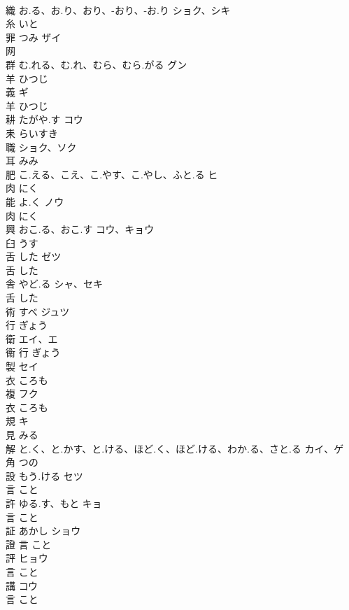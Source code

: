 \documentclass[8pt]{extreport}
\begin{document}
\begin{CJK}{UTF8}{min}
\\	織	お.る、お.り、おり、-おり、-お.り	ショク、シキ	
\\	糸		いと		
\\	罪	つみ	ザイ	
\\	网				
\\	群	む.れる、む.れ、むら、むら.がる	グン	
\\	羊		ひつじ		
\\	義		ギ	
\\	羊		ひつじ		
\\	耕	たがや.す	コウ	
\\	耒		らいすき		
\\	職		ショク、ソク	
\\	耳		みみ		
\\	肥	こ.える、こえ、こ.やす、こ.やし、ふと.る	ヒ	
\\	肉		にく		
\\	能	よ.く	ノウ	
\\	肉		にく		
\\	興	おこ.る、おこ.す	コウ、キョウ	
\\	臼		うす		
\\	舌	した	ゼツ	
\\	舌		した		
\\	舎	やど.る	シャ、セキ	
\\	舌		した		
\\	術	すべ	ジュツ	
\\	行		ぎょう		
\\	衛		エイ、エ	
\\	衞	行		ぎょう		
\\	製		セイ	
\\	衣		ころも		
\\	複		フク	
\\	衣		ころも		
\\	規		キ	
\\	見		みる		
\\	解	と.く、と.かす、と.ける、ほど.く、ほど.ける、わか.る、さと.る	カイ、ゲ	
\\	角		つの		
\\	設	もう.ける	セツ	
\\	言		こと		
\\	許	ゆる.す、もと	キョ	
\\	言		こと		
\\	証	あかし	ショウ	
\\	證	言		こと		
\\	評		ヒョウ	
\\	言		こと		
\\	講		コウ	
\\	言		こと		

\end{CJK}
\end{document}
